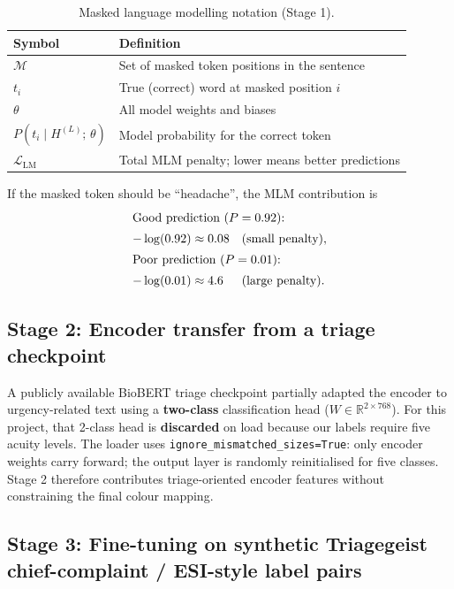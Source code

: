 \begin{table}[H]
\centering
\small
\begin{tabular}{|l|p{10cm}|}
\hline
\textbf{Symbol} & \textbf{Definition} \\
\hline
\(\mathcal{M}\) & Set of masked token positions in the sentence \\
\(t_i\) & True (correct) word at masked position \(i\) \\
\(\theta\) & All model weights and biases \\
\(P(t_i \mid H^{(L)};\,\theta)\) & Model probability for the correct token \\
\(\mathcal{L}_{\mathrm{LM}}\) & Total MLM penalty; lower means better predictions \\
\hline
\end{tabular}
\caption{Masked language modelling notation (Stage 1).}
\label{tab:mlm-symbols}
\end{table}

\begin{example}
If the masked token should be ``headache'', the MLM contribution is
\begin{align*}
  \shortintertext{Good prediction (\(P = 0.92\)):}
  -\log(0.92) &\approx 0.08 && \text{(small penalty)}, \\
  \shortintertext{Poor prediction (\(P = 0.01\)):}
  -\log(0.01) &\approx 4.6 && \text{(large penalty)}.
\end{align*}
\end{example}

\subsection{Stage 2: Encoder transfer from a triage checkpoint}

A publicly available BioBERT triage checkpoint partially adapted the encoder to urgency-related text using a \textbf{two-class} classification head (\(W \in \mathbb{R}^{2 \times 768}\)). For this project, that 2-class head is \textbf{discarded} on load because our labels require five acuity levels. The loader uses \texttt{ignore\_mismatched\_sizes=True}: only encoder weights carry forward; the output layer is randomly reinitialised for five classes. Stage 2 therefore contributes triage-oriented encoder features without constraining the final colour mapping.

\subsection{Stage 3: Fine-tuning on synthetic Triagegeist chief-complaint / ESI-style label pairs}
\label{sec:training}

